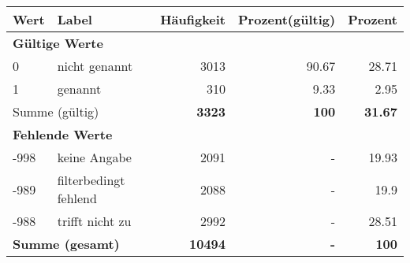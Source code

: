      \begin{longtable}{lXrrr}
     \toprule
     \textbf{Wert} & \textbf{Label} & \textbf{Häufigkeit} & \textbf{Prozent(gültig)} & \textbf{Prozent} \\
     \endhead
     \midrule
     \multicolumn{5}{l}{\textbf{Gültige Werte}}\\

     0 &
     \multicolumn{1}{X}{ nicht genannt   } &


       \num{3013} &
       \num[round-mode=places,round-precision=2]{90.67} &
         \num[round-mode=places,round-precision=2]{28.71} \\

     1 &
     \multicolumn{1}{X}{ genannt   } &


       \num{310} &
       \num[round-mode=places,round-precision=2]{9.33} &
         \num[round-mode=places,round-precision=2]{2.95} \\
     \midrule
     \multicolumn{2}{l}{Summe (gültig)} &
       \textbf{\num{3323}} &
     \textbf{\num{100}} &
       \textbf{\num[round-mode=places,round-precision=2]{31.67}} \\
     \multicolumn{5}{l}{\textbf{Fehlende Werte}}\\
       -998 &
       keine Angabe &
         \num{2091} &
        - &
         \num[round-mode=places,round-precision=2]{19.93} \\
       -989 &
       filterbedingt fehlend &
         \num{2088} &
        - &
         \num[round-mode=places,round-precision=2]{19.9} \\
       -988 &
       trifft nicht zu &
         \num{2992} &
        - &
         \num[round-mode=places,round-precision=2]{28.51} \\
     \midrule
     \multicolumn{2}{l}{\textbf{Summe (gesamt)}} &
          \textbf{\num{10494}} &
        \textbf{-} &
        \textbf{\num{100}} \\
     \bottomrule
     \end{longtable}
     
